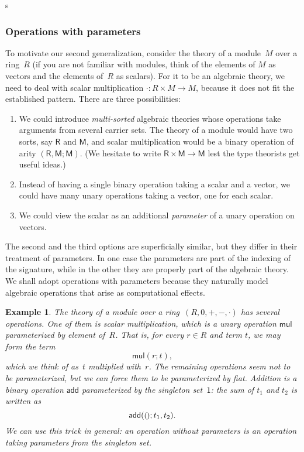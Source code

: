 s\documentclass{amsart}
\newcommand{\one}{\mathsf{1}} %
\newcommand{\unit}{{\text{\small$()$}}} %
\newtheorem{example}[definition]{Example}
\begin{document}
\subsubsection{Operations with parameters}
\label{sec:oper-with-param}

To motivate our second generalization, consider the theory of a module~$M$ over
a ring~$R$ (if you are not familiar with modules, think of the elements of $M$
as vectors and the elements of~$R$ as scalars). For it to be an algebraic
theory, we need to deal with scalar multiplication ${\cdot} : R \times M \to M$,
because it does not fit the established pattern. There are three possibilities:
%
\begin{enumerate}
\item We could introduce \emph{multi-sorted} algebraic theories whose operations
  take arguments from several carrier sets. The theory of a module would have
  two sorts, say $\mathsf{R}$ and $\mathsf{M}$, and scalar multiplication would
  be a binary operation of arity $(\mathsf{R}, \mathsf{M}; \mathsf{M})$. (We
  hesitate to write $\mathsf{R} \times \mathsf{M} \to \mathsf{M}$ lest the type
  theorists get useful ideas.)
\item Instead of having a single binary operation taking a scalar and a vector,
  we could have many unary operations taking a vector, one for each scalar.
\item We could view the scalar as an additional \emph{parameter} of a
  unary operation on vectors.
\end{enumerate}
%
The second and the third options are superficially similar, but they differ in
their treatment of parameters. In one case the parameters are part of the
indexing of the signature, while in the other they are properly part of the
algebraic theory. We shall adopt operations with parameters because they
naturally model algebraic operations that arise as computational effects.

\begin{example}
  The theory of a module over a ring~$(R, 0, {+}, {-}, {\cdot})$ has several
  operations. One of them is scalar multiplication, which is a \emph{unary}
  operation $\mathsf{mul}$ parameterized by element of~$R$. That is, for every
  $r \in R$ and term $t$, we may form the term
  \begin{equation*}
    \mathsf{mul}(r; t),
  \end{equation*}
  which we think of as~$t$ multiplied with~$r$. The remaining operations seem
  not to be parameterized, but we can force them to be parameterized by fiat.
  Addition is a binary operation $\mathsf{add}$ parameterized by the singleton
  set~$\one$: the sum of $t_1$ and $t_2$ is written as
  \begin{equation*}
    \mathsf{add}(\unit; t_1, t_2).
  \end{equation*}
  We can use this trick in general: an operation without parameters is an
  operation taking parameters from the singleton set.
\end{example}
\end{document}
